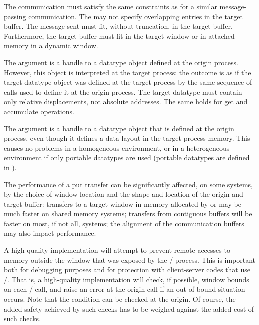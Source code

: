 The communication must satisfy the same constraints as for a similar message-passing communication.  The  may not specify overlapping entries in the target buffer.
The message sent must fit, without truncation, in the target buffer.
Furthermore, the target buffer
must fit in the target window or in attached memory in a
dynamic window.

The  argument
is a handle to a datatype object defined at the origin process.
However, this object is interpreted at the target process: the outcome
is as if the target datatype object was defined at the target process
by the same sequence of calls used to define it at the origin process.
The target datatype must 
contain only relative displacements, not absolute addresses.
The same
holds for get and accumulate
operations.

\begin{users}
The  argument is a handle to a datatype
object
that is defined at the origin process, even though it defines a data
layout in
the target process memory.  This causes no problems in a homogeneous
environment, or in a heterogeneous environment if only portable
datatypes are used (portable datatypes are defined in
).

The performance of a put transfer can be significantly affected, on
some systems,
by the choice of window location and the shape and location
of the origin and target buffer: transfers to a target window in memory
allocated by  or  may be much faster on shared
memory systems;
transfers from contiguous buffers will be
faster on most, if not all, systems;  the alignment of the
communication buffers may also impact performance.
\end{users}

\begin{implementors}
A high-quality 
implementation will attempt to
prevent remote accesses to memory outside the
window that was exposed by the \mpi/ process.
This is important both for debugging
purposes and for protection with client-server codes that use \RMA/.
That is,
a high-quality implementation will check, if possible,
window bounds on each \RMA/ call,
and raise an error at the origin call if an out-of-bound
situation occurs.
Note that the condition can be checked at the origin.
Of course, the added safety achieved by such checks has to be weighed
against the added cost of such checks.
\end{implementors}


